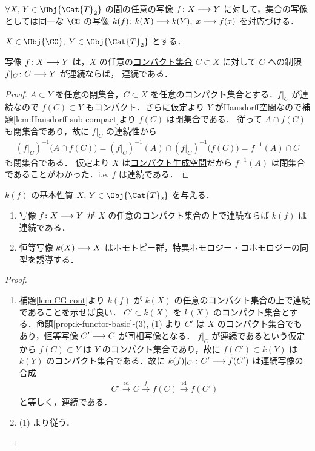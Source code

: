\documentclass[algtopo_main]{subfiles}
\begin{document}
$\forall X,\, Y \in \Obj{\Cat{T}_2}$ の間の任意の写像 $f \colon X \longrightarrow Y$ に対して，集合の写像としては同一な $\CG$ の写像
$k(f) \colon k(X) \longrightarrow k(Y),\; x \longmapsto f(x)$ を対応づける．

\begin{mylem}[label=lem:CG-cont]{}
    $X \in \Obj{\CG},\; Y \in \Obj{\Cat{T}_2}$ とする．
    
    写像 $f \colon X \longrightarrow Y$ は，$X$ の任意の\hyperref[def:compact]{コンパクト集合} $C \subset X$ に対して $C$ への制限 $f|_C \colon C \longrightarrow Y$ が連続ならば， 
    連続である．
\end{mylem}

\begin{proof}
    $A \subset Y$ を任意の閉集合，$C \subset X$ を任意のコンパクト集合とする．$f|_C$ が連続なので $f(C) \subset Y$ もコンパクト．さらに仮定より $Y$ がHausdorff空間なので補題\ref{lem:Hausdorff-sub-compact}より $f(C)$ は閉集合である．
    従って $A \cap f(C)$ も閉集合であり，故に $f|_C$ の連続性から
    \begin{align}
        (f|_C)^{-1} \bigl( A \cap f(C) \bigr) = (f|_C)^{-1}(A) \cap (f|_C)^{-1} \bigl( f(C) \bigr) = f^{-1}(A) \cap C
    \end{align}
    も閉集合である．
    仮定より $X$ は\hyperref[def:CG]{コンパクト生成空間}だから $f^{-1}(A)$ は閉集合であることがわかった．i.e. $f$ は連続である．
\end{proof}

\begin{myprop}[label=prop:k-functor-basic2]{$k(f)$ の基本性質}
    $X,\, Y \in \Obj{\Cat{T}_2}$ を与える．
    \begin{enumerate}
        \item 写像 $f \colon X \longrightarrow Y$ が $X$ の任意のコンパクト集合の上で連続ならば $k(f)$ は連続である．
        \item 恒等写像 $k(X) \longrightarrow X$ はホモトピー群，特異ホモロジー・コホモロジーの同型を誘導する．
    \end{enumerate}
\end{myprop}

\begin{proof}
    \begin{enumerate}
        \item 補題\ref{lem:CG-cont}より $k(f)$ が $k(X)$ の任意のコンパクト集合の上で連続であることを示せば良い．
        $C' \subset k(X)$ を $k(X)$ のコンパクト集合とする．命題\ref{prop:k-functor-basic}-(3), (1) より $C'$ は $X$ のコンパクト集合でもあり，恒等写像 $C' \longrightarrow C$ が同相写像となる．
        $f|_C$ が連続であるという仮定から $f(C) \subset Y$ は $Y$ のコンパクト集合であり，故に $f(C') \subset k(Y)$ は $k(Y)$ のコンパクト集合である．故に $k(f)|_{C'} \colon C' \longrightarrow f(C')$ は連続写像の合成
        \begin{align}
            C' \xrightarrow{\mathrm{id}} C \xrightarrow{f} f(C) \xrightarrow{\mathrm{id}} f(C')
        \end{align}
        と等しく，連続である．
        \item (1) より従う．
    \end{enumerate}
\end{proof}
\end{document}
